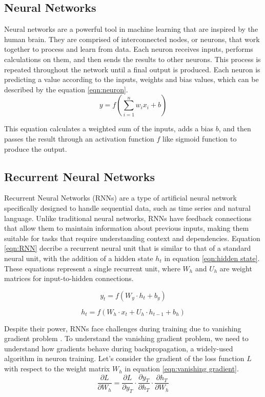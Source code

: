 \documentclass[12pt]{article}
\begin{document}
\subsection{Neural Networks}
Neural networks are a powerful tool in machine learning that are inspired by the human brain. They are comprised of interconnected nodes, or neurons, that work together to process and learn from data. Each neuron receives inputs, performs calculations on them, and then sends the results to other neurons. 
This process is repeated throughout the network until a final output is produced. Each neuron is predicting a value according to the inputs, weights and bias values, which can be described by the equation \ref{eqn:neuron}.
\begin{equation}
    \label{eqn:neuron}
    y = f\left(\sum_{i=1}^{n} w_i x_i + b\right)
\end{equation}

\noindent This equation calculates a weighted sum of the inputs, adds a bias $b$, and then passes the result through an activation function $f$ like sigmoid function to produce the output\cite{hossain2023machine}.

\subsection{Recurrent Neural Networks}
Recurrent Neural Networks (RNNs) are a type of artificial neural network specifically designed to handle sequential data, such as time series and natural language. Unlike traditional neural networks, RNNs have feedback connections that allow them to maintain information about previous inputs, making them suitable for tasks that require understanding context and dependencies. 
Equation \ref{eqn:RNN} decribe a recurrent neural unit that is similar to that of a standard neural unit, with the addition of a hidden state $h_t$ in equation \ref*{eqn:hidden state}. These equations represent a single recurrent unit, where $W_h$ and $U_h$ are weight matrices for input-to-hidden connections\cite{liou2008modeling}.

\begin{equation}
    \label{eqn:RNN}
    y_t = f(W_y \cdot h_t + b_y)
\end{equation}

\begin{equation}
    \label{eqn:hidden state}
    h_t = f(W_h \cdot x_t + U_h \cdot h_{t-1} + b_h)
\end{equation}

\noindent Despite their power, RNNs face challenges during training due to vanishing gradient problem \cite{tanaka2021deep}. 
To understand the vanishing gradient problem, we need to understand how gradients behave during backpropagation, a widely-used algorithm in neuron training. Let's consider the gradient of the loss function $L$ with respect to the weight matrix $W_h$ in equation \ref{eqn:vanishing gradient}.
\begin{equation}
    \label{eqn:vanishing gradient}
    \frac{\partial L}{\partial W_{h}} = \frac{\partial L}{\partial y_T} \cdot \frac{\partial y_T}{\partial h_T} \cdot \frac{\partial h_T}{\partial W_{h}}
\end{equation}
\end{document}
